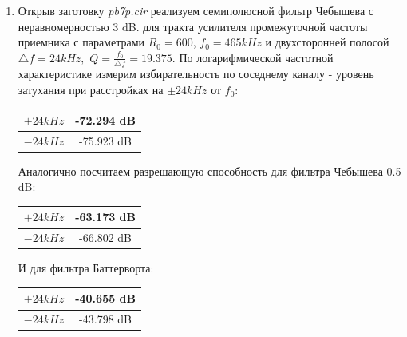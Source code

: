 \documentclass[a4paper, 12pt]{article}%
\begin{document}
\begin{enumerate}

\item Открыв заготовку \textit{pb7p.cir} реализуем семиполюсной фильтр Чебышева с неравномерностью 3 dB. для тракта усилителя промежуточной частоты приемника с параметрами $R_0 = 600$, $f_0 = 465 kHz$ и двухсторонней полосой $\bigtriangleup f = 24 kHz,$ $Q = \frac{f_0}{\bigtriangleup f} = 19.375$. По логарифмической частотной характеристике измерим избирательность по соседнему каналу - уровень затухания при расстройках на $\pm 24 kHz$ от $f_0$:

\begin{center}
\begin{tabular}{|c|c|}
\hline 
$+24 kHz$ & -72.294 dB \\ 
\hline 
$-24 kHz$ & -75.923 dB \\ 
\hline 
\end{tabular} 
\end{center}

Аналогично посчитаем разрешающую способность для фильтра Чебышева 0.5 dB:

\begin{center}
\begin{tabular}{|c|c|}
\hline 
$+24 kHz$ & -63.173 dB \\ 
\hline 
$-24 kHz$ & -66.802 dB \\ 
\hline 
\end{tabular} 
\end{center}

И для фильтра Баттерворта:

\begin{center}
\begin{tabular}{|c|c|}
\hline 
$+24 kHz$ & -40.655 dB \\ 
\hline 
$-24 kHz$ & -43.798 dB \\ 
\hline 
\end{tabular} 
\end{center}

\end{enumerate}
\end{document}
